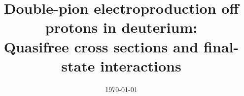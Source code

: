 \documentclass[prc,twocolumn,superscriptaddress,showpacs,amssymb,amsmath,amsfonts,aps,nofootinbib]{revtex4-1}
\begin{document}

\date{\today}
\title{\large Double-pion electroproduction off protons in deuterium: \\Quasifree cross sections and final-state interactions \\}




\end{document}
